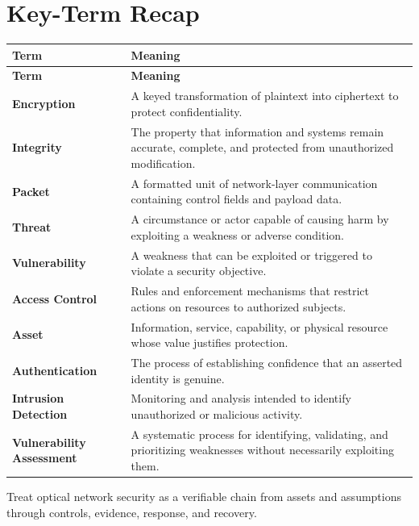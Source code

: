 \documentclass[11pt]{article}
\begin{document}
\section*{Key-Term Recap}
\begin{longtable}{>{\RaggedRight\arraybackslash}p{}>{\RaggedRight\arraybackslash}p{}}
\toprule\rowcolor{Navy}\color{white}\textbf{Term} & \color{white}\textbf{Meaning}\\\midrule
\endfirsthead
\toprule\rowcolor{Navy}\color{white}\textbf{Term} & \color{white}\textbf{Meaning}\\\midrule
\endhead
\textbf{Encryption} & A keyed transformation of plaintext into ciphertext to protect confidentiality. \\\midrule
\textbf{Integrity} & The property that information and systems remain accurate, complete, and protected from unauthorized modification. \\\midrule
\textbf{Packet} & A formatted unit of network-layer communication containing control fields and payload data. \\\midrule
\textbf{Threat} & A circumstance or actor capable of causing harm by exploiting a weakness or adverse condition. \\\midrule
\textbf{Vulnerability} & A weakness that can be exploited or triggered to violate a security objective. \\\midrule
\textbf{Access Control} & Rules and enforcement mechanisms that restrict actions on resources to authorized subjects. \\\midrule
\textbf{Asset} & Information, service, capability, or physical resource whose value justifies protection. \\\midrule
\textbf{Authentication} & The process of establishing confidence that an asserted identity is genuine. \\\midrule
\textbf{Intrusion Detection} & Monitoring and analysis intended to identify unauthorized or malicious activity. \\\midrule
\textbf{Vulnerability Assessment} & A systematic process for identifying, validating, and prioritizing weaknesses without necessarily exploiting them. \\\midrule
\bottomrule
\end{longtable}
\begin{takeawaybox}
Treat optical network security as a verifiable chain from assets and assumptions through controls, evidence, response, and recovery.
\end{takeawaybox}
\end{document}
